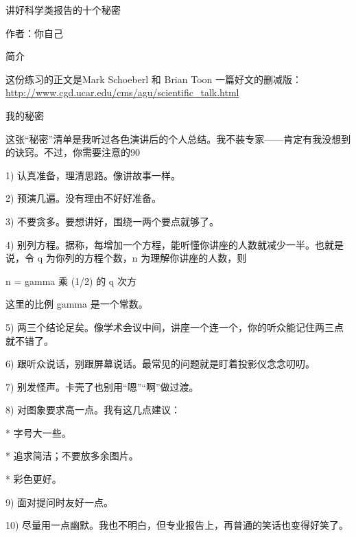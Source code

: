 \documentclass[12pt]{article}
\begin{document}
讲好科学类报告的十个秘密

作者：你自己

简介

这份练习的正文是Mark Schoeberl 和 Brian Toon 一篇好文的删减版：
\url{http://www.cgd.ucar.edu/cms/agu/scientific_talk.html}

我的秘密

这张“秘密”清单是我听过各色演讲后的个人总结。我不装专家——肯定有我没想到的诀窍。不过，你需要注意的90%

1) 认真准备，理清思路。像讲故事一样。

2) 预演几遍。没有理由不好好准备。

3) 不要贪多。要想讲好，围绕一两个要点就够了。

4) 别列方程。据称，每增加一个方程，能听懂你讲座的人数就减少一半。也就是说，令 q 为你列的方程个数，n 为理解你讲座的人数，则

n = gamma 乘 (1/2) 的 q 次方

这里的比例 gamma 是一个常数。

5) 两三个结论足矣。像学术会议中间，讲座一个连一个，你的听众能记住两三点就不错了。

6) 跟听众说话，别跟屏幕说话。最常见的问题就是盯着投影仪念念叨叨。

7) 别发怪声。卡壳了也别用“嗯”“啊”做过渡。

8) 对图象要求高一点。我有这几点建议：

* 字号大一些。

* 追求简洁；不要放多余图片。

* 彩色更好。

9) 面对提问时友好一点。

10) 尽量用一点幽默。我也不明白，但专业报告上，再普通的笑话也变得好笑了。
\end{document}
